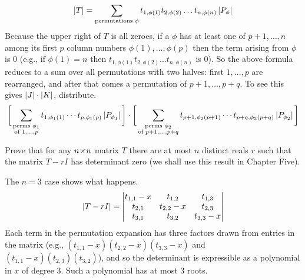 \begin{exercises}
\begin{answer}
\begin{equation*}
        \deter{T}=
        \sum_{\text{\scriptsize permutations }\phi}
                t_{1,\phi(1)}t_{2,\phi(2)}\dots t_{n,\phi(n)}
                \deter{P_{\phi}}
      \end{equation*}
      Because the upper right of \( T \) is all zeroes, if a
      \( \phi \) has at least one of \( p+1,\dots,n \) among its first
      \( p \) column numbers \( \phi(1),\dots,\phi(p) \) then the term arising
      from \( \phi \) is \( 0 \)
      (e.g., if \( \phi(1)=n \) then
      \( t_{1,\phi(1)}t_{2,\phi(2)}\dots t_{n,\phi(n)} \)
      is \( 0 \)).
      So the above formula reduces to a sum over all permutations
      with two halves:
      first \( 1,\dots,p \) are rearranged, and after that comes
      a permutation of
      \( p+1,\dots,p+q \).
      To see this gives \( \deter{J}\cdot\deter{K}  \), distribute.
      \begin{equation*}
         \bigg[\sum_{\substack{\text{\scriptsize perms }\phi_1 \\
                              \text{\scriptsize of } 1,\dots,p}}
               t_{1,\phi_1(1)}\cdots t_{p,\phi_1(p)} 
               \deter{P_{\phi_1}}                            \bigg]\cdot
         \bigg[\sum_{\substack{\text{\scriptsize perms }\phi_2 \\
                              \text{\scriptsize of } p+1,\dots,p+q}}
               t_{p+1,\phi_2(p+1)}\cdots t_{p+q,\phi_2(p+q)} 
               \deter{P_{\phi_2}}                          \bigg]
      \end{equation*}  
    \end{answer}
  \recommended \item
    Prove that for any \( n \! \times \! n \) matrix \( T \) there are at most
    \( n \) distinct reals \( r \) such that the matrix \( T-rI \) has
    determinant zero
    (we shall use this result in Chapter Five).
    \begin{answer}
      The $n=3$ case shows what happens.
      \begin{equation*}
        \deter{T-rI}
        =
        \begin{vmatrix}
          t_{1,1}-x  &t_{1,2}   &t_{1,3}  \\ 
          t_{2,1}    &t_{2,2}-x &t_{2,3}  \\ 
          t_{3,1}    &t_{3,2}   &t_{3,3}-x  
        \end{vmatrix}
      \end{equation*}
      Each term in the permutation expansion has three factors drawn from 
      entries in the matrix (e.g., $(t_{1,1}-x)(t_{2,2}-x)(t_{3,3}-x)$
      and $(t_{1,1}-x)(t_{2,3})(t_{3,2})$), and so the determinant is
      expressible as a polynomial in $x$ of degree $3$.
      Such a polynomial has at most $3$ roots.


\end{answer}
\end{exercises}
